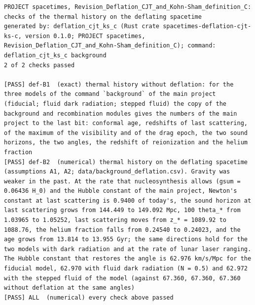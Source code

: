 \documentclass[
  10pt,
]{article}
\begin{document}
\begin{verbatim}
PROJECT spacetimes, Revision_Deflation_CJT_and_Kohn-Sham_definition_C: checks of the thermal history on the deflating spacetime
generated by: deflation_cjt_ks_c (Rust crate spacetimes-deflation-cjt-ks-c, version 0.1.0; PROJECT spacetimes, Revision_Deflation_CJT_and_Kohn-Sham_definition_C); command: deflation_cjt_ks_c background
2 of 2 checks passed

[PASS] def-B1  (exact) thermal history without deflation: for the three models of the command `background` of the main project (fiducial; fluid dark radiation; stepped fluid) the copy of the background and recombination modules gives the numbers of the main project to the last bit: conformal age, redshifts of last scattering, of the maximum of the visibility and of the drag epoch, the two sound horizons, the two angles, the redshift of reionization and the helium fraction
[PASS] def-B2  (numerical) thermal history on the deflating spacetime (assumptions A1, A2; data/background_deflation.csv). Gravity was weaker in the past. At the rate that nucleosynthesis allows (gsum = 0.06436 H_0) and the Hubble constant of the main project, Newton's constant at last scattering is 0.9400 of today's, the sound horizon at last scattering grows from 144.449 to 149.092 Mpc, 100 theta_* from 1.03965 to 1.05252, last scattering moves from z_* = 1089.92 to 1088.76, the helium fraction falls from 0.24540 to 0.24023, and the age grows from 13.814 to 13.955 Gyr; the same directions hold for the two models with dark radiation and at the rate of lunar laser ranging. The Hubble constant that restores the angle is 62.976 km/s/Mpc for the fiducial model, 62.970 with fluid dark radiation (N = 0.5) and 62.972 with the stepped fluid of the model (against 67.360, 67.360, 67.360 without deflation at the same angles)
[PASS] ALL  (numerical) every check above passed
\end{verbatim}
\end{document}
